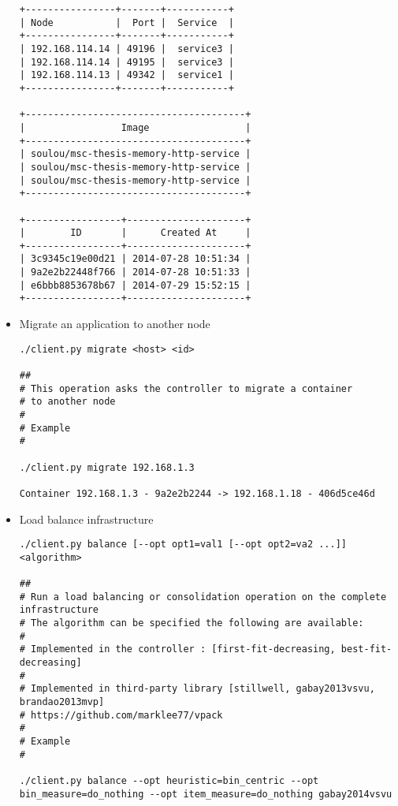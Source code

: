 \begin{itemize}
{\begin{lstlisting}
+----------------+-------+-----------+
| Node           |  Port |  Service  |
+----------------+-------+-----------+
| 192.168.114.14 | 49196 |  service3 |
| 192.168.114.14 | 49195 |  service3 |
| 192.168.114.13 | 49342 |  service1 |
+----------------+-------+-----------+

+---------------------------------------+
|                 Image                 |
+---------------------------------------+
| soulou/msc-thesis-memory-http-service |
| soulou/msc-thesis-memory-http-service |
| soulou/msc-thesis-memory-http-service |
+---------------------------------------+

+-----------------+---------------------+
|        ID       |      Created At     |
+-----------------+---------------------+
| 3c9345c19e00d21 | 2014-07-28 10:51:34 |
| 9a2e2b22448f766 | 2014-07-28 10:51:33 |
| e6bbb8853678b67 | 2014-07-29 15:52:15 |
+-----------------+---------------------+
\end{lstlisting}}
\item{Migrate an application to another node
\begin{lstlisting}
./client.py migrate <host> <id>

##
# This operation asks the controller to migrate a container
# to another node
#
# Example
#

./client.py migrate 192.168.1.3

Container 192.168.1.3 - 9a2e2b2244 -> 192.168.1.18 - 406d5ce46d
\end{lstlisting}}
\item{Load balance infrastructure
\begin{lstlisting}
./client.py balance [--opt opt1=val1 [--opt opt2=va2 ...]] <algorithm>

##
# Run a load balancing or consolidation operation on the complete infrastructure
# The algorithm can be specified the following are available:
#
# Implemented in the controller : [first-fit-decreasing, best-fit-decreasing]
#
# Implemented in third-party library [stillwell, gabay2013vsvu, brandao2013mvp]
# https://github.com/marklee77/vpack
#
# Example
#

./client.py balance --opt heuristic=bin_centric --opt bin_measure=do_nothing --opt item_measure=do_nothing gabay2014vsvu


\end{lstlisting}}
\end{itemize}
